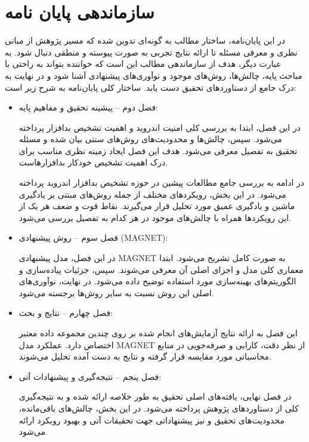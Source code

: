 \section{سازماندهی پایان نامه}\label{organiz}
در این پایان‌نامه، ساختار مطالب به گونه‌ای تدوین شده که مسیر پژوهش از مبانی نظری و معرفی مسئله تا ارائه نتایج تجربی به صورت پیوسته و منطقی دنبال شود. به عبارت دیگر، هدف از سازماندهی مطالب این است که خواننده بتواند به راحتی با مباحث پایه، چالش‌ها، روش‌های موجود و نوآوری‌های پیشنهادی آشنا شود و در نهایت به درک جامع از دستاوردهای تحقیق دست یابد. ساختار کلی پایان‌نامه به شرح زیر است:
\begin{itemize}
    \item فصل دوم – پیشینه تحقیق و مفاهیم پایه:
    
    در این فصل، ابتدا به بررسی کلی امنیت اندروید و اهمیت تشخیص بدافزار پرداخته می‌شود. سپس، چالش‌ها و محدودیت‌های روش‌های سنتی بیان شده و مسئله تحقیق به تفصیل معرفی می‌شود. هدف این فصل ایجاد زمینه نظری مناسب برای درک اهمیت تشخیص خودکار بدافزارهاست.
    
    در ادامه به بررسی جامع مطالعات پیشین در حوزه تشخیص بدافزار اندروید پرداخته می‌شود. در این بخش، رویکردهای مختلف از جمله روش‌های مبتنی بر یادگیری ماشین و یادگیری عمیق مورد تحلیل قرار می‌گیرند. نقاط قوت و ضعف هر یک از این رویکردها همراه با چالش‌های موجود در هر کدام به تفصیل بررسی می‌شود.
    
    \item فصل سوم – روش پیشنهادی (MAGNET):
    
    در این فصل، مدل پیشنهادی MAGNET به صورت کامل تشریح می‌شود. ابتدا معماری کلی مدل و اجزای اصلی آن معرفی می‌شوند. سپس، جزئیات پیاده‌سازی و الگوریتم‌های بهینه‌سازی مورد استفاده توضیح داده می‌شود. در نهایت، نوآوری‌های اصلی این روش نسبت به سایر روش‌ها برجسته می‌شود.
    
    \item فصل چهارم – نتایج و بحث:
    
    این فصل به ارائه نتایج آزمایش‌های انجام شده بر روی چندین مجموعه داده معتبر اختصاص دارد. عملکرد مدل MAGNET از نظر دقت، کارایی و صرفه‌جویی در منابع محاسباتی مورد مقایسه قرار گرفته و نتایج به دست آمده تحلیل می‌شوند.
    
    \item فصل پنجم – نتیجه‌گیری و پیشنهادات آتی:
    
    در فصل نهایی، یافته‌های اصلی تحقیق به طور خلاصه ارائه شده و به نتیجه‌گیری کلی از دستاوردهای پژوهش پرداخته می‌شود. در این بخش، چالش‌های باقی‌مانده، محدودیت‌های تحقیق و نیز پیشنهاداتی جهت تحقیقات آتی و بهبود رویکرد ارائه می‌شود.
\end{itemize}


